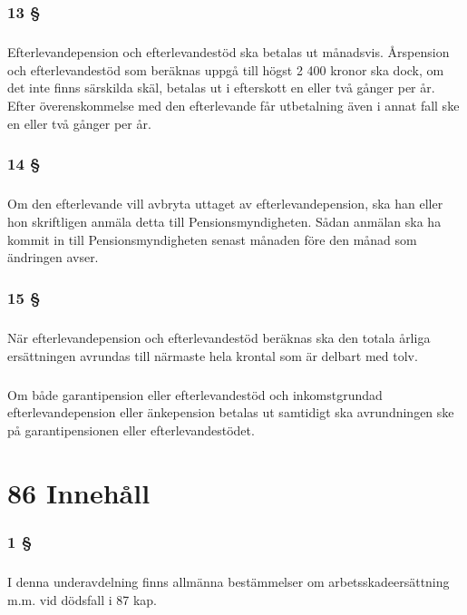 \documentclass[a4paper,notitlepage,openany,10pt]{book}
\begin{document}
\subsection*{13 §}
\paragraph*{}
Efterlevandepension och efterlevandestöd ska betalas ut månadsvis. Årspension och efterlevandestöd som beräknas uppgå till högst 2 400 kronor ska dock, om det inte finns särskilda skäl, betalas ut i efterskott en eller två gånger per år.
Efter överenskommelse med den efterlevande får utbetalning även i annat fall ske en eller två gånger per år.
\subsection*{14 §}
\paragraph*{}
Om den efterlevande vill avbryta uttaget av efterlevandepension, ska han eller hon skriftligen anmäla detta till Pensionsmyndigheten. Sådan anmälan ska ha kommit in till Pensionsmyndigheten senast månaden före den månad som ändringen avser.
\subsection*{15 §}
\paragraph*{}
När efterlevandepension och efterlevandestöd beräknas ska den totala årliga ersättningen avrundas till närmaste hela krontal som är delbart med tolv.
\paragraph*{}
Om både garantipension eller efterlevandestöd och inkomstgrundad efterlevandepension eller änkepension betalas ut samtidigt ska avrundningen ske på garantipensionen eller efterlevandestödet.
\chapter*{86 Innehåll}
\subsection*{1 §}
\paragraph*{}
I denna underavdelning finns allmänna bestämmelser om arbetsskadeersättning m.m. vid dödsfall i 87 kap.
\end{document}
